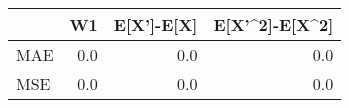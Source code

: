 \begin{tabular}{lrrr}
\toprule
{} &   W1 &  E[X']-E[X] &  E[X'\textasciicircum 2]-E[X\textasciicircum 2] \\
\midrule
MAE &  0.0 &         0.0 &             0.0 \\
MSE &  0.0 &         0.0 &             0.0 \\
\bottomrule
\end{tabular}
